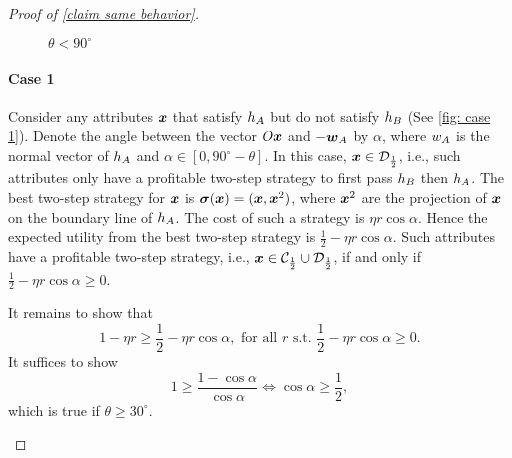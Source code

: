 \begin{proof}[Proof of \cref{claim same behavior}]
\begin{figure}
\caption{$\theta<90^{\circ}$}
\label{fig:acute}
\end{figure}

    \paragraph{Case 1} Consider any attributes $\boldsymbol{x}$ that satisfy $h_A$  but do not satisfy $h_B$ (See \cref{fig: case 1}).
    Denote the angle between the vector $O\boldsymbol{x}$ and $-\boldsymbol{w}_A$ by $\alpha$, where $w_A$ is the normal vector of $h_A$ and $\alpha\in [0,90^{\circ}-\theta]$.
    In this case, $\boldsymbol{x}\in\mathcal{D}_{\frac12}$, i.e., such attributes only have a profitable two-step strategy to first pass $h_B$ then $h_A$. 
    The best two-step strategy for $\boldsymbol{x}$ is $\boldsymbol{\sigma}(\boldsymbol{x})=(\boldsymbol{x},\boldsymbol{x}^2)$, where $\boldsymbol{x}^2$ are the projection of $\boldsymbol{x}$ on the boundary line of $h_A$.
    The cost of such a strategy is $\eta r \cos{\alpha}$.
    Hence the expected utility from the best two-step strategy is $\frac12-\eta r \cos{\alpha}$.
    Such attributes have a profitable two-step strategy, i.e., $\boldsymbol{x}\in \mathcal{C}_{\frac12}\cup\mathcal{D}_{\frac12}$, if and only if $\frac12-\eta r \cos{\alpha}\geq 0$.
    
    It remains to show that 
    $$1-\eta r\geq \frac12-\eta r \cos{\alpha}, \text{ for all } r \text{ s.t. } \frac12-\eta r \cos{\alpha}\geq 0.$$
    It suffices to show 
    $$1\geq \frac{1- \cos{\alpha}}{\cos{\alpha}}\Leftrightarrow \cos{\alpha}\geq \frac12,$$ 
    which is true if $\theta\geq 30^{\circ}$.
    

\begin{figure}[t]
\centering
{}
\end{figure}
\end{proof}
